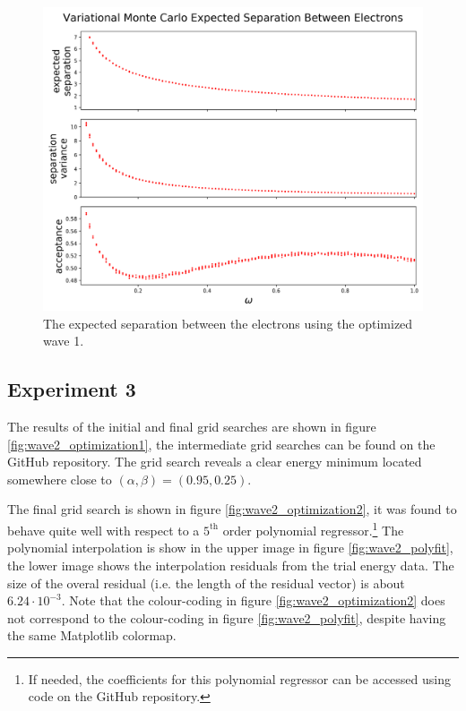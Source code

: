 \documentclass[nofootinbib,reprint,english]{revtex4-1}
\begin{document}
\begin{figure}[h!]
\centering
\includegraphics[scale=0.34]{../results/wave1/expected_separation_3_edited.png}
\caption{The expected separation between the electrons using the optimized wave 1.}\label{fig:wave1_separation}
\end{figure}

\clearpage
\subsection{Experiment 3}
The results of the initial and final grid searches are shown in figure \ref{fig:wave2_optimization1}, the intermediate grid searches can be found on the GitHub repository. The grid search reveals a clear energy minimum located somewhere close to \((\alpha,\beta)=(0.95,0.25)\).

The final grid search is shown in figure \ref{fig:wave2_optimization2}, it was found to behave quite well with respect to a \(5^\text{th}\) order polynomial regressor.\footnote{If needed, the coefficients for this polynomial regressor can be accessed using code on the GitHub repository.} The polynomial interpolation is show in the upper image in figure \ref{fig:wave2_polyfit}, the lower image shows the interpolation residuals from the trial energy data. The size of the overal residual (i.e. the length of the residual vector) is about \(6.24\cdot10^{-3}\). Note that the colour-coding in figure \ref{fig:wave2_optimization2} does not correspond to the colour-coding in figure \ref{fig:wave2_polyfit}, despite having the same Matplotlib colormap.
\end{document}
